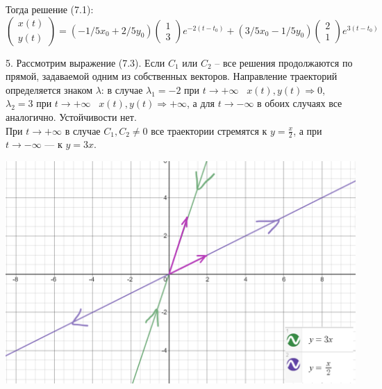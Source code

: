\documentclass[10pt]{report}
\begin{document}
Тогда решение (7.1):
\[\left(
\begin{array}{c}
x(t)\\
y(t)
\end{array}
\right)
=(-1/5x_{0}+2/5y_{0})
\left(
\begin{array}{c}
1\\
3
\end{array}
\right)
e^{-2(t-t_0)}+(3/5x_{0}-1/5y_{0})
\left(
\begin{array}{c}
2\\
1
\end{array}
\right)
e^{3(t-t_0)}
\]

5. Рассмотрим выражение (7.3). Если $C_1$ или $C_2$ -- все решения продолжаются по прямой, задаваемой одним из собственных векторов. Направление траекторий определяется знаком $\lambda$: в случае $\lambda_1=-2$ при $ t \rightarrow +\infty \;\;\;  x(t), y(t) \Rightarrow 0$, $\lambda_2=3$ при $ t \rightarrow +\infty \;\;\;  x(t), y(t) \Rightarrow +\infty$, а для $ t \rightarrow -\infty$ в обоих случаях все аналогично. Устойчивости нет. \\
При $ t \rightarrow +\infty$ в случае $C_1, C_2 \neq 0 $ все траектории стремятся к $y= \frac x 2$, а при $ t \rightarrow - \infty$ --- к $y= 3x.$
\begin{center}
{\includegraphics[scale=0.4]{graph7.4.png}} 
\end{center}
\end{document}
